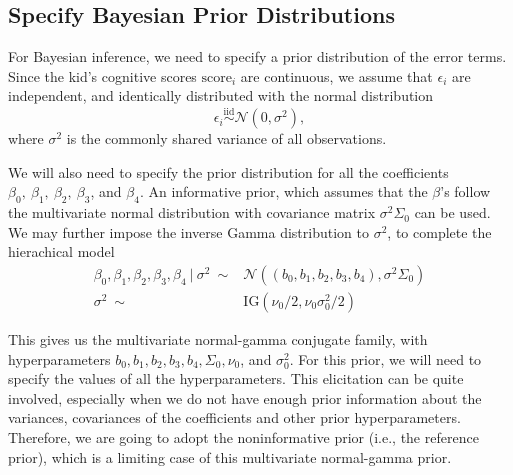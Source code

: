 \documentclass[]{book}
\newenvironment{Shaded}{\begin{snugshade}}{\end{snugshade}}
\newcommand{\KeywordTok}[1]{\textcolor[rgb]{0.13,0.29,0.53}{\textbf{{#1}}}}
\newcommand{\DecValTok}[1]{\textcolor[rgb]{0.00,0.00,0.81}{{#1}}}
\newcommand{\StringTok}[1]{\textcolor[rgb]{0.31,0.60,0.02}{{#1}}}
\newcommand{\CommentTok}[1]{\textcolor[rgb]{0.56,0.35,0.01}{\textit{{#1}}}}
\newcommand{\NormalTok}[1]{{#1}}
\theoremstyle{definition}
\theoremstyle{definition}
\theoremstyle{definition}
\theoremstyle{remark}
\begin{document}
\begin{Shaded}
\end{Shaded}

\subsection{Specify Bayesian Prior
Distributions}\label{specify-bayesian-prior-distributions}

For Bayesian inference, we need to specify a prior distribution of the
error terms. Since the kid's cognitive scores \(\text{score}_i\) are
continuous, we assume that \(\epsilon_i\) are independent, and
identically distributed with the normal distribution
\[ \epsilon_i \overset{\text{iid}}{\sim} \mathcal{N}(0, \sigma^2), \]
where \(\sigma^2\) is the commonly shared variance of all observations.

We will also need to specify the prior distribution for all the
coefficients \(\beta_0,\ \beta_1,\ \beta_2,\ \beta_3\), and \(\beta_4\).
An informative prior, which assumes that the \(\beta\)'s follow the
multivariate normal distribution with covariance matrix
\(\sigma^2\Sigma_0\) can be used. We may further impose the inverse
Gamma distribution to \(\sigma^2\), to complete the hierachical model
\[ 
\begin{aligned}
\beta_0, \beta_1, \beta_2, \beta_3, \beta_4 ~|~\sigma^2 \ \sim & \mathcal{N}((b_0, b_1, b_2, b_3, b_4), \sigma^2\Sigma_0)\\
\sigma^2 \ \sim & \text{IG}(\nu_0/2, \nu_0\sigma_0^2/2) 
\end{aligned}
\]

This gives us the multivariate normal-gamma conjugate family, with
hyperparameters \(b_0, b_1, b_2, b_3, b_4, \Sigma_0, \nu_0\), and
\(\sigma_0^2\). For this prior, we will need to specify the values of
all the hyperparameters. This elicitation can be quite involved,
especially when we do not have enough prior information about the
variances, covariances of the coefficients and other prior
hyperparameters. Therefore, we are going to adopt the noninformative
prior (i.e., the reference prior), which is a limiting case of this
multivariate normal-gamma prior.
\end{document}
